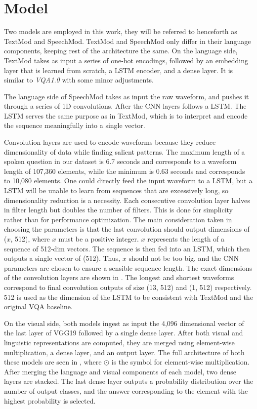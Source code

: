\documentclass[letterpaper]{article} %
\begin{document}
\section{Model}
Two models are employed in this work, they will be referred to henceforth as TextMod and SpeechMod. TextMod and SpeechMod only differ in their language components, keeping rest of the architecture the same. On the language side, TextMod takes as input a series of one-hot encodings, followed by an embedding layer that is learned from scratch, a LSTM encoder, and a dense layer. It is similar to \textit{VQA1.0} with some minor adjustments.

The language side of SpeechMod takes as input the raw waveform, and pushes it through a series of 1D convolutions. After the CNN layers follows a LSTM. The LSTM serves the same purpose as in TextMod, which is to interpret and encode the sequence meaningfully into a single vector.

Convolution layers are used to encode waveforms because they reduce dimensionality of data while finding salient patterns. The maximum length of a spoken question in our dataset is 6.7 seconds and corresponds to a waveform length of 107,360 elements, while the minimum is 0.63 seconds and corresponds to 10,080 elements. One could directly feed the input waveform to a LSTM, but a LSTM will be unable to learn from sequences that are excessively long, so dimensionality reduction is a necessity. Each consecutive convolution layer halves in filter length but doubles the number of filters. This is done for simplicity rather than for performance optimization. The main consideration taken in choosing the parameters is that the last convolution should output dimensions of ($x$, 512), where $x$ must be a positive integer. $x$ represents the length of a sequence of 512-dim vectors. The sequence is then fed into an LSTM, which then outputs a single vector of (512). Thus, $x$ should not be too big, and the CNN parameters are chosen to ensure a sensible sequence length. The exact dimensions of the convolution layers are shown in . The longest and shortest waveforms correspond to final convolution outputs of size (13, 512) and (1, 512) respectively. 512 is used as the dimension of the LSTM to be consistent with TextMod and the original VQA baseline.

On the visual side, both models ingest as input the 4,096 dimensional vector of the last layer of VGG19 \cite{vgg16} followed by a single dense layer. After both visual and linguistic representations are computed, they are merged using element-wise multiplication, a dense layer, and an output layer. The full architecture of both these models are seen in , where $\displaystyle\odot$ is the symbol for element-wise multiplication. After merging the language and visual components of each model, two dense layers are stacked. The last dense layer outputs a probability distribution over the number of output classes, and the answer corresponding to the element with the highest probability is selected.
\end{document}
